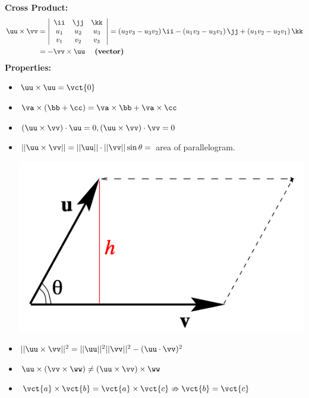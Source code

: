 \begin{spacing}{1.3}
    {\bf Cross Product:}
    \def\arraystretch{0.8}
    \begin{align*} 
        \uu \times \vv &=\left|
            \begin{array}{ccc}
                \ii & \jj & \kk \\ 
                u_{1} & u_{2} & u_{3} \\ 
                v_{1} & v_{2} & v_{3}
            \end{array}
            \right|
        =\left(u_{2} v_{3}-u_{3} v_{2}\right) \ii-
        \left(u_{1} v_{3}-u_{3} v_{1}\right) \jj+
        \left(u_{1} v_{2}-u_{2} v_{1}\right) \kk \\ 
        &=-\vv \times \uu \quad \text { \bf (vector) } 
    \end{align*}
    {\bf Properties:}
    \begin{itemize}
        \item $\uu\times \uu = \vct{0}$
        \item $\va\times(\bb+\cc)=\va\times \bb+\va\times \cc$
        \item $(\uu\times \vv)\cdot \uu=0, (\uu\times \vv)\cdot \vv=0$
        \item $||\uu\times \vv||=||\uu||\cdot ||\vv||\sin\theta=$ area of parallelogram.
        \begin{center}
            \includegraphics[scale=0.5]{images/Ch10-cross-product-geometry.png}
        \end{center}
        \item $||\uu \times \vv||^2=||\uu||^2||\vv||^2-(\uu\cdot \vv)^2$
        \item $\uu\times(\vv\times \ww)\ne (\uu\times \vv)\times \ww$
        \item $\vct{a}\times \vct{b}=\vct{a}\times \vct{c} \nRightarrow \vct{b}=\vct{c}$
    \end{itemize}


\end{spacing}
